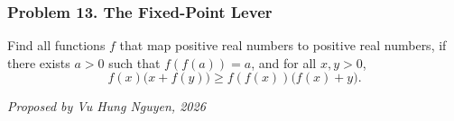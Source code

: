 \subsubsection*{Problem 13. The Fixed-Point Lever}

\begin{exercisebox}[hard]

Find all functions $f$ that map positive real numbers
to positive real numbers, if there exists $a>0$ such that
$f(f(a))=a$, and for all $x,y>0$,
\[
f(x)\bigl(x+f(y)\bigr)
\geq f(f(x))\bigl(f(x)+y\bigr).
\]

\begin{flushright}
\textit{Proposed by Vu Hung Nguyen, 2026}
\end{flushright}


\end{exercisebox}